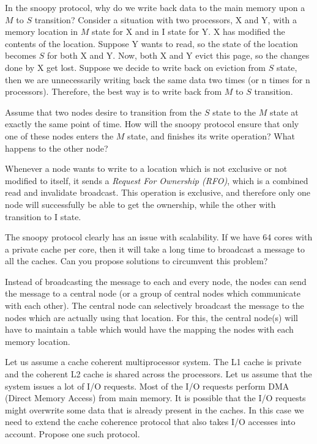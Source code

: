\begin{ExerciseList}
\Exercise
In the snoopy protocol, why do we write back data to the main memory upon a $M$ to $S$ transition?
\Answer
Consider a situation with two processors, X and Y, with a memory location in $M$ state for X and in I state for Y. X has modified the contents of
the location. Suppose Y wants to read, so the state of the location becomes $S$ for both X and Y. Now, both X and Y evict this page, so the
changes done by X get lost. Suppose we decide to write back on eviction from $S$ state, then we are unnecessarily writing back the same 
data two times (or n times for n processors). Therefore, the best way is to write back from $M$ to $S$ transition. 

\Exercise
Assume that two nodes desire to transition from the $S$ state to the $M$ state at exactly the same
point of time. How will the snoopy protocol ensure that only one of these nodes enters the $M$
state, and finishes its write operation? What happens to the other node?

\Answer
Whenever a node wants to write to a location which is not exclusive or not modified to itself, it sends a 
{\em Request For Ownership (RFO)}, which is a combined read and invalidate broadcast. This operation is exclusive, and therefore
only one node will successfully be able to get the ownership, while the other with transition to I state.


\Exercise
The snoopy protocol clearly has an issue with scalability. If we have 64 cores with a private cache
per core, then it will take a long time to broadcast
a message to all the caches. Can you propose solutions to circumvent this problem?

\Answer
Instead of broadcasting the message to each and every node, the nodes can send the message to a central node (or a group of
central nodes which communicate with each other). The central node can selectively broadcast the message to the nodes which
are actually using that location. For this, the central node(s) will have to maintain a table which would have the mapping the
nodes with each memory location.


\Exercise
Let us assume a cache coherent multiprocessor system. The L1 cache is private and the coherent L2 cache
is shared across the processors. Let us assume that the system issues a lot of I/O requests. Most of the I/O
requests perform DMA (Direct Memory Access) from main memory. It is possible that the I/O requests
might overwrite some data that is already present in the caches. In this case we need to extend the cache
coherence protocol that also takes I/O accesses into account. Propose one such protocol.


\end{ExerciseList}
